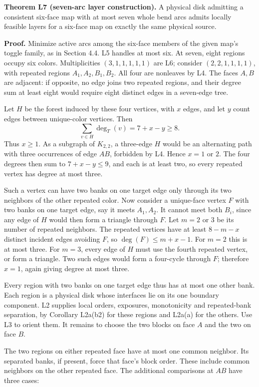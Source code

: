 \documentclass[
  11pt,
]{article}
\begin{document}
\textbf{Theorem L7 (seven-arc layer construction).} A physical disk
admitting a consistent six-face map with at most seven whole bend arcs
admits locally feasible layers for a six-face map on exactly the same
physical source.

\textbf{Proof.} Minimize active arcs among the six-face members of the
given map's toggle family, as in Section 4.4. L5 handles at most six. At
seven, eight regions occupy six colors. Multiplicities \((3,1,1,1,1,1)\)
are L6; consider \((2,2,1,1,1,1)\), with repeated regions
\(A_1,A_2,B_1,B_2\). All four are nonleaves by L4. The faces \(A,B\) are
adjacent: if opposite, no edge joins two repeated regions, and their
degree sum at least eight would require eight distinct edges in a
seven-edge tree.

Let \(H\) be the forest induced by these four vertices, with \(x\)
edges, and let \(y\) count edges between unique-color vertices. Then \[
\sum_{v\in H}\deg_T(v)=7+x-y\ge8.
\] Thus \(x\ge1\). As a subgraph of \(K_{2,2}\), a three-edge \(H\)
would be an alternating path with three occurrences of edge \(AB\),
forbidden by L4. Hence \(x=1\) or \(2\). The four degrees then sum to
\(7+x-y\le9\), and each is at least two, so every repeated vertex has
degree at most three.

Such a vertex can have two banks on one target edge only through its two
neighbors of the other repeated color. Now consider a unique-face vertex
\(F\) with two banks on one target edge, say it meets \(A_1,A_2\). It
cannot meet both \(B_i\), since any edge of \(H\) would then form a
triangle through \(F\). Let \(m=2\) or \(3\) be its number of repeated
neighbors. The repeated vertices have at least \(8-m-x\) distinct
incident edges avoiding \(F\), so \(\deg(F)\le m+x-1\). For \(m=2\) this
is at most three. For \(m=3\), every edge of \(H\) must use the fourth
repeated vertex, or form a triangle. Two such edges would form a
four-cycle through \(F\); therefore \(x=1\), again giving degree at most
three.

Every region with two banks on one target edge thus has at most one
other bank. Each region is a physical disk whose interfaces lie on its
one boundary component. L2 supplies local orders, exposures,
monotonicity and repeated-bank separation, by Corollary L2a(b2) for
these regions and L2a(a) for the others. Use L3 to orient them. It
remains to choose the two blocks on face \(A\) and the two on face
\(B\).

The two regions on either repeated face have at most one common
neighbor. Its separated banks, if present, force that face's block
order. These include common neighbors on the other repeated face. The
additional comparisons at \(AB\) have three cases:
\end{document}
